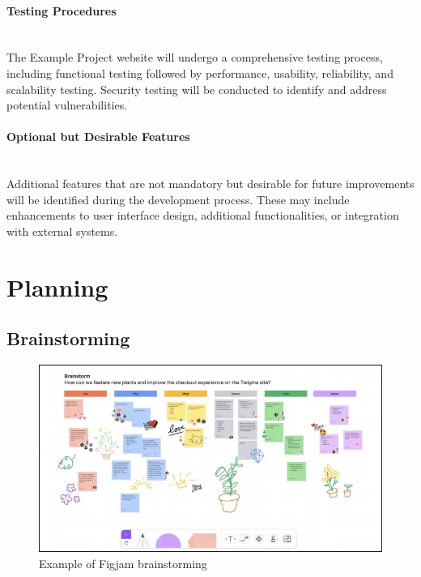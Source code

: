 \documentclass[12pt,a4paper]{article}
\begin{document}
\begin{spacing}{1.5}
    \paragraph{Testing Procedures} \mbox{} \\ \indent
    The Example Project website will undergo a comprehensive testing process, including functional testing followed by performance, usability, reliability, and scalability testing. Security testing will be conducted to identify and address potential vulnerabilities.

    \paragraph{Optional but Desirable Features} \mbox{} \\ \indent
    Additional features that are not mandatory but desirable for future improvements will be identified during the development process. These may include enhancements to user interface design, additional functionalities, or integration with external systems.

    \newpage
    \section{Planning}
    \subsection{Brainstorming}
    \begin{figure}[h]
        \centering
        \includegraphics[width=13cm]{assets/brainstorming-example.png}
        \caption{Example of Figjam brainstorming}
        \label{fig:figjam-brainstorming}
    \end{figure}
    \FloatBarrier


\end{spacing}
\end{document}
